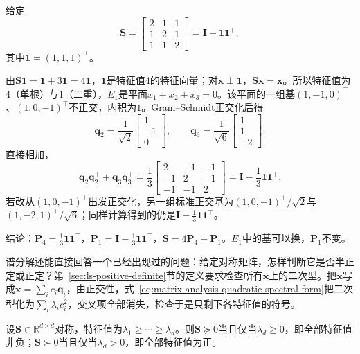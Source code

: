 \begin{example}[重根空间的两组基]
\label{ex:ls-repeated-eigenspace-projection}
给定
\[
 \bm S=\begin{bmatrix}2&1&1\\1&2&1\\1&1&2\end{bmatrix}=\bm I+\bm 1\bm 1^\top ,
\]
其中$\bm 1=(1,1,1)^\top$。

由$\bm S\bm 1=\bm 1+3\bm 1=4\bm 1$，$\bm 1$是特征值$4$的特征向量；对$\bm x\perp\bm 1$，$\bm S\bm x=\bm x$。所以特征值为$4$（单根）与$1$（二重），$E_1$是平面$x_1+x_2+x_3=0$。该平面的一组基$(1,-1,0)^\top$、$(1,0,-1)^\top$不正交，内积为$1$。Gram--Schmidt正交化后得
\[
 \bm q_2=\frac1{\sqrt2}\begin{bmatrix}1\\-1\\0\end{bmatrix},\qquad
 \bm q_3=\frac1{\sqrt6}\begin{bmatrix}1\\1\\-2\end{bmatrix}.
\]
直接相加，
\[
 \bm q_2\bm q_2^\top+\bm q_3\bm q_3^\top
 =\frac13\begin{bmatrix}2&-1&-1\\-1&2&-1\\-1&-1&2\end{bmatrix}
 =\bm I-\frac13\bm 1\bm 1^\top .
\]
若改从$(1,0,-1)^\top$出发正交化，另一组标准正交基为$(1,0,-1)^\top/\sqrt2$与$(1,-2,1)^\top/\sqrt6$；同样计算得到的仍是$\bm I-\frac13\bm 1\bm 1^\top$。

结论：$\bm P_4=\frac13\bm 1\bm 1^\top$，$\bm P_1=\bm I-\frac13\bm 1\bm 1^\top$，$\bm S=4\bm P_4+\bm P_1$。$E_1$中的基可以换，$\bm P_1$不变。
\end{example}

谱分解还能直接回答一个已经出现过的问题：给定对称矩阵，怎样判断它是否半正定或正定？第~\ref{sec:ls-positive-definite}节的定义要求检查所有$\bm x$上的二次型。把$\bm x$写成$\bm x=\sum_ic_i\bm q_i$，由正交性，式~\eqref{eq:matrix-analysis-quadratic-spectral-form}把二次型化为$\sum_i\lambda_ic_i^2$，交叉项全部消失，检查于是只剩下各特征值的符号。

\begin{theorem}[用特征值判定定号性]
\label{thm:ls-symmetric-definiteness-eigenvalues}
设$\bm S\in\mathbb R^{d\times d}$对称，特征值为$\lambda_1\geq\cdots\geq\lambda_d$。则$\bm S\succeq0$当且仅当$\lambda_d\geq0$，即全部特征值非负；$\bm S\succ0$当且仅当$\lambda_d>0$，即全部特征值为正。
\end{theorem}

